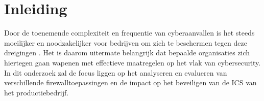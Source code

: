 


% 

\section{Inleiding}%
\label{sec:inleiding}

Door de toenemende complexiteit en frequentie van cyberaanvallen is het steeds moeilijker en noodzakelijker voor bedrijven om zich te beschermen tegen deze dreigingen \autocite{saravanan2019}. Het is daarom uitermate belangrijk dat bepaalde organisaties zich hiertegen gaan wapenen met effectieve maatregelen op het vlak van cybersecurity. In dit onderzoek zal de focus liggen op het analyseren en evalueren van verschillende firewalltoepassingen en de impact op het beveiligen van de ICS van het productiebedrijf.


